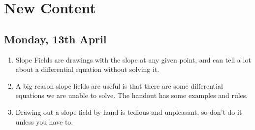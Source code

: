 \documentclass[11pt]{article}
\begin{document}
\section{New Content}
\subsection{Monday, 13th April}
\begin{enumerate}
	\item Slope Fields are drawings with the slope at any given point, and can tell a 
		lot about a differential equation without solving it.
	\item A big reason slope fields are useful is that there are some differential
		equations we are unable to solve.  The handout has some examples and rules.
	\item Drawing out a slope field by hand is tedious and unpleasant, so don't
		do it unless you have to.
\end{enumerate}
\end{document}

